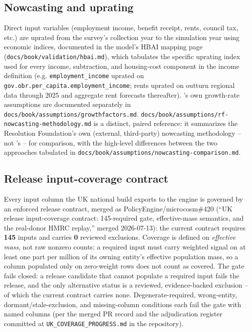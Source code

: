 \subsection{Nowcasting and uprating}

Direct input variables (employment income, benefit receipt, rents, council
tax, etc.) are uprated from the survey's collection year to the simulation
year using \obr{} economic indices, documented in the model's HBAI mapping
page (\texttt{docs/book/validation/hbai.md}), which tabulates the specific
uprating index used for every income, subtraction, and housing-cost
component in the \hbai{} income definition (e.g. \texttt{employment\_income}
uprated on \texttt{gov.obr.per\_capita.employment\_income}; rents uprated on
outturn regional data through 2025 and \obr{} aggregate rent forecasts
thereafter). \policyengine{}'s own growth-rate assumptions are documented
separately in \texttt{docs/book/assumptions/growthfactors.md}.
\texttt{docs/book/assumptions/rf-nowcasting-methodology.md} is a distinct,
paired reference: it summarizes the Resolution Foundation's own (external,
third-party) nowcasting methodology -- not \policyengine{}'s -- for
comparison, with the high-level differences between the two approaches
tabulated in \texttt{docs/book/assumptions/nowcasting-comparison.md}.

\subsection{Release input-coverage contract}
\label{sec:data-coverage}

Every input column the UK national build exports to the engine is governed
by an enforced release contract, merged as PolicyEngine/microcosm\#420
(``UK release input-coverage contract: 145-required gate, effective-mass
semantics, and the real-donor HMRC replay,'' merged 2026-07-13): the
current contract requires \textbf{145} inputs and carries \textbf{0}
reviewed exclusions. Coverage is defined on \emph{effective mass}, not raw
nonzero counts: a required input must carry weighted signal on at least
one part per million of its owning entity's effective population mass, so
a column populated only on zero-weight rows does not count as covered. The
gate fails closed: a release candidate that cannot populate a required
input fails the release, and the only alternative status is a reviewed,
evidence-backed exclusion -- of which the current contract carries none.
Degenerate-required, wrong-entity, dormant/stale-exclusion, and
missing-column conditions each fail the gate with named columns (per the
merged PR record and the adjudication register committed at
\texttt{UK\_COVERAGE\_PROGRESS.md} in the \microcosm{} repository).

